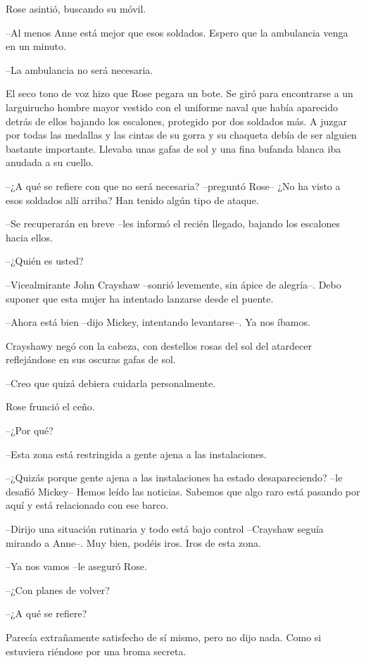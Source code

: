 {Rose asintió, buscando su móvil.}

{--Al menos Anne está mejor que esos soldados. Espero que la ambulancia
venga en un minuto.}

{--La ambulancia no será necesaria.}

{El seco tono de voz hizo que Rose pegara un bote. Se giró para
 encontrarse a un larguirucho hombre mayor vestido con el uniforme naval
 que había aparecido detrás de ellos bajando los escalones, protegido por
 dos soldados más. A juzgar por todas las medallas y las cintas de su
 gorra y su chaqueta debía de ser alguien bastante importante. Llevaba
unas gafas de sol y una fina bufanda blanca iba anudada a su cuello.}

{--¿A qué se refiere con que no será necesaria? --preguntó Rose-- ¿No ha
visto a esos soldados allí arriba? Han tenido algún tipo de ataque.}

{--Se recuperarán en breve --les informó el recién llegado, bajando los
escalones hacia ellos.}

{--¿Quién es usted?}

{--Vicealmirante John Crayshaw --sonrió levemente, sin ápice de
 alegría--. Debo suponer que esta mujer ha intentado lanzarse desde el
puente.}

{--Ahora está bien --dijo Mickey, intentando levantarse--. Ya nos
íbamos.}

{Crayshawy negó con la cabeza, con destellos rosas del sol del atardecer
reflejándose en sus oscuras gafas de sol.}

{--Creo que quizá debiera cuidarla personalmente.}

{Rose frunció el ceño.}

{--¿Por qué?}

{--Esta zona está restringida a gente ajena a las instalaciones.}

{--¿Quizás porque gente ajena a las instalaciones ha estado
 desapareciendo? --le desafió Mickey-- Hemos leído las noticias. Sabemos
que algo raro está pasando por aquí y está relacionado con ese barco.}

{--Dirijo una situación rutinaria y todo está bajo control --Crayshaw
seguía mirando a Anne--. Muy bien, podéis iros. Iros de esta zona.}

{--Ya nos vamos --le aseguró Rose.}

{--¿Con planes de volver?}

{--¿A qué se refiere?}

{Parecía extrañamente satisfecho de sí mismo, pero no dijo nada. Como si
estuviera riéndose por una broma secreta.}

